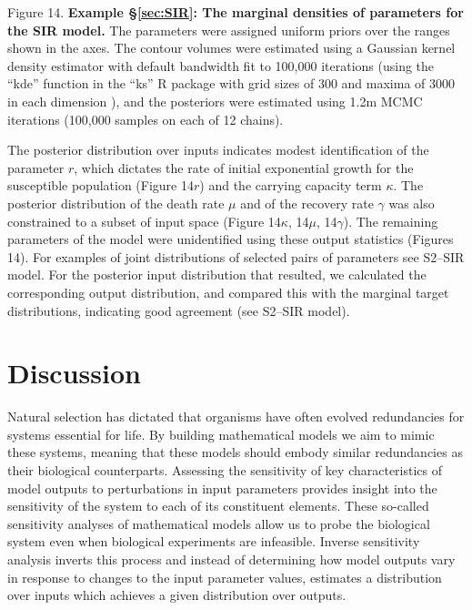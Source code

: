 \documentclass[10pt,letterpaper]{article}
\begin{document}
\vspace{0.5cm}

Figure 14. {\bf Example \S \ref{sec:SIR}: The marginal densities of parameters for the SIR model.} The parameters were assigned uniform priors over the ranges shown in the axes. The contour volumes were estimated using a Gaussian kernel density estimator with default bandwidth fit to 100,000 iterations (using the ``kde'' function in the ``ks'' R \cite{RLanguage} package with grid sizes of 300 and maxima of 3000 in each dimension \cite{duong2018package}), and the posteriors were estimated using 1.2m MCMC iterations (100,000 samples on each of 12 chains).

\vspace{0.5cm}

The posterior distribution over inputs indicates modest identification of the parameter $r$, which dictates the rate of initial exponential growth for the susceptible population (Figure 14$r$) and the carrying capacity term $\kappa$.
The posterior distribution of the death rate $\mu$ and of the recovery rate $\gamma$ was also constrained to a subset of input space (Figure 14$\kappa$, 14$\mu$, 14$\gamma$). The remaining parameters of the model were unidentified using these output statistics (Figures 14). For examples of joint distributions of selected pairs of parameters see S2--SIR model. For the posterior input distribution that resulted, we calculated the corresponding output distribution, and compared this with the marginal target distributions, indicating good agreement (see S2--SIR model).




\section{Discussion}
\label{sec:discussion}

Natural selection has dictated that organisms have often evolved redundancies for systems essential for life. By building mathematical models we aim to mimic these systems, meaning that these models should embody similar redundancies as their biological counterparts. Assessing the sensitivity of key characteristics of model outputs to perturbations in input parameters provides insight into the sensitivity of the system to each of its constituent elements. These so-called sensitivity analyses of mathematical models allow us to probe the biological system even when biological experiments are infeasible. Inverse sensitivity analysis inverts this process and instead of determining how model outputs vary in response to changes to the input parameter values, estimates a distribution over inputs which achieves a given distribution over outputs.
\end{document}
